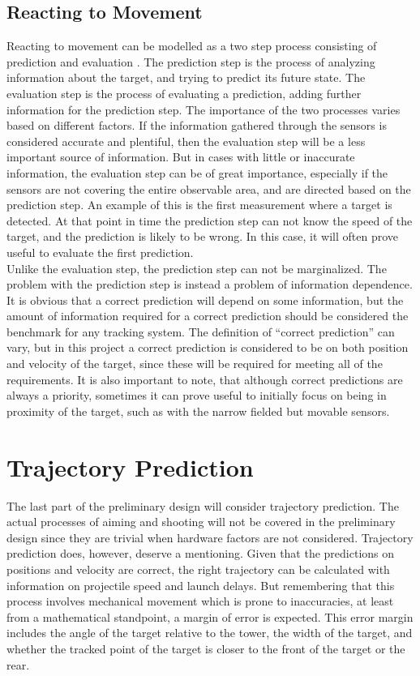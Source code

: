 \subsection{Reacting to Movement}
Reacting to movement can be modelled as a two step process consisting of prediction and evaluation \cite{1219468}. The prediction step is the process of analyzing information about the target, and trying to predict its future state. The evaluation step is the process of evaluating a prediction, adding further information for the prediction step. The importance of the two processes varies based on different factors. If the information gathered through the sensors is considered accurate and plentiful, then the evaluation step will be a less important source of information. But in cases with little or inaccurate information, the evaluation step can be of great importance, especially if the sensors are not covering the entire observable area, and are directed based on the prediction step. An example of this is the first measurement where a target is detected. At that point in time the prediction step can not know the speed of the target, and the prediction is likely to be wrong. In this case, it will often prove useful to evaluate the first prediction. \\

Unlike the evaluation step, the prediction step can not be marginalized. The problem with the prediction step is instead a problem of information dependence. It is obvious that a correct prediction will depend on some information, but the amount of information required for a correct prediction should be considered the benchmark for any tracking system. The definition of \enquote{correct prediction} can vary, but in this project a correct prediction is considered to be on both position and velocity of the target, since these will be required for meeting all of the requirements. It is also important to note, that although correct predictions are always a priority, sometimes it can prove useful to initially focus on being in proximity of the target, such as with the narrow fielded but movable sensors.

\section{Trajectory Prediction}\label{predesign:shoot}
The last part of the preliminary design will consider trajectory prediction. The actual processes of aiming and shooting will not be covered in the preliminary design since they are trivial when hardware factors are not considered. Trajectory prediction does, however, deserve a mentioning. Given that the predictions on positions and velocity are correct, the right trajectory can be calculated with information on projectile speed and launch delays. But remembering that this process involves mechanical movement which is prone to inaccuracies, at least from a mathematical standpoint, a margin of error is expected. This error margin includes the angle of the target relative to the tower, the width of the target, and whether the tracked point of the target is closer to the front of the target or the rear.\\


